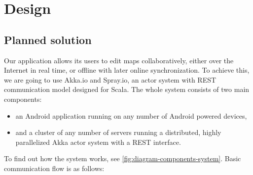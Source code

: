 %
%
%
%
%

\chapter{Design}
\label{chap:project}



\section{Planned solution}
\label{sec:plan}

Our application allows its users to edit maps collaboratively, either over the Internet in real time, or offline with later online synchronization. To achieve this, we are going to use Akka.io and Spray.io, an actor system with REST communication model designed for Scala. The whole system consists of two main components:

\begin{itemize}
	\item an Android application running on any number of Android powered devices,
	\item and a cluster of any number of servers running a distributed, highly parallelized Akka actor system with a REST interface.
\end{itemize}

To find out how the system works, see \cref{fig:diagram-components-system}. Basic communication flow is as follows:

